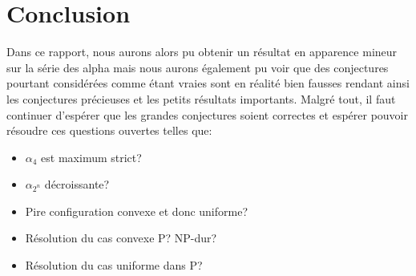 \section{Conclusion}

Dans ce rapport, nous aurons alors pu obtenir un résultat en apparence mineur sur la série des alpha mais nous aurons également pu voir que des conjectures pourtant considérées comme étant vraies sont en réalité bien fausses rendant ainsi les conjectures précieuses et les petits résultats importants. Malgré tout, il faut continuer d'espérer que les grandes conjectures soient correctes et espérer pouvoir résoudre ces questions ouvertes telles que:

\begin{itemize}

\item $\alpha_4$ est maximum strict?
\item $\alpha_{2^n}$ décroissante?
\item Pire configuration convexe et donc uniforme?
\item Résolution du cas convexe P? NP-dur?
\item Résolution du cas uniforme dans P?

\end{itemize}